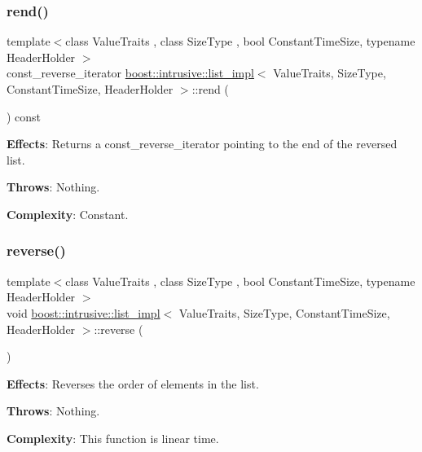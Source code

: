 \subsubsection{\texorpdfstring{rend()}{rend()}\hspace{0.1cm}{\footnotesize\ttfamily [2/2]}}
{\footnotesize\ttfamily template$<$class Value\+Traits , class Size\+Type , bool Constant\+Time\+Size, typename Header\+Holder $>$ \\
const\+\_\+reverse\+\_\+iterator \hyperlink{classboost_1_1intrusive_1_1list__impl}{boost\+::intrusive\+::list\+\_\+impl}$<$ Value\+Traits, Size\+Type, Constant\+Time\+Size, Header\+Holder $>$\+::rend (\begin{DoxyParamCaption}{ }\end{DoxyParamCaption}) const\hspace{0.3cm}{\ttfamily [inline]}}

{\bfseries Effects}\+: Returns a const\+\_\+reverse\+\_\+iterator pointing to the end of the reversed list.

{\bfseries Throws}\+: Nothing.

{\bfseries Complexity}\+: Constant. \mbox{\label{classboost_1_1intrusive_1_1list__impl_a09ad4e2d3e2561d0cfe1be3ab7601b9c}} 
\subsubsection{\texorpdfstring{reverse()}{reverse()}}
{\footnotesize\ttfamily template$<$class Value\+Traits , class Size\+Type , bool Constant\+Time\+Size, typename Header\+Holder $>$ \\
void \hyperlink{classboost_1_1intrusive_1_1list__impl}{boost\+::intrusive\+::list\+\_\+impl}$<$ Value\+Traits, Size\+Type, Constant\+Time\+Size, Header\+Holder $>$\+::reverse (\begin{DoxyParamCaption}{ }\end{DoxyParamCaption})\hspace{0.3cm}{\ttfamily [inline]}}

{\bfseries Effects}\+: Reverses the order of elements in the list.

{\bfseries Throws}\+: Nothing.

{\bfseries Complexity}\+: This function is linear time.

